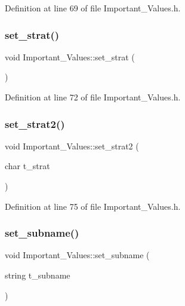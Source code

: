 Definition at line 69 of file Important\+\_\+\+Values.\+h.

\mbox{\label{class_important___values_ac2a5895eab687e6852c5569e03e2c0d0}} 
\subsubsection{\texorpdfstring{set\_strat()}{set\_strat()}}
{\footnotesize\ttfamily void Important\+\_\+\+Values\+::set\+\_\+strat (\begin{DoxyParamCaption}{ }\end{DoxyParamCaption})\hspace{0.3cm}{\ttfamily [inline]}}



Definition at line 72 of file Important\+\_\+\+Values.\+h.

\mbox{\label{class_important___values_ac2792a8a882a06c8ff7d48e4da56c9d2}} 
\subsubsection{\texorpdfstring{set\_strat2()}{set\_strat2()}}
{\footnotesize\ttfamily void Important\+\_\+\+Values\+::set\+\_\+strat2 (\begin{DoxyParamCaption}\item[{char}]{t\+\_\+strat }\end{DoxyParamCaption})\hspace{0.3cm}{\ttfamily [inline]}}



Definition at line 75 of file Important\+\_\+\+Values.\+h.

\mbox{\label{class_important___values_abb848847b7923651d8ea13d7f6938ede}} 
\subsubsection{\texorpdfstring{set\_subname()}{set\_subname()}}
{\footnotesize\ttfamily void Important\+\_\+\+Values\+::set\+\_\+subname (\begin{DoxyParamCaption}\item[{string}]{t\+\_\+subname }\end{DoxyParamCaption})\hspace{0.3cm}{\ttfamily [inline]}}



